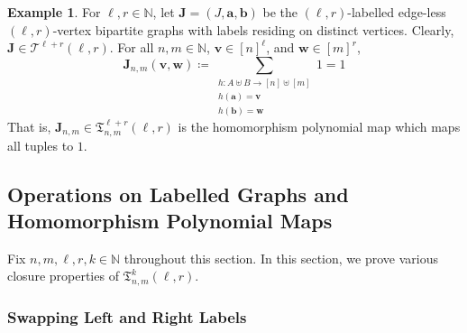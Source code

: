 \documentclass[10pt,a4paper]{article}
\theoremstyle{definition}
\newtheorem{example}[definition]{Example}
\theoremstyle{plain}
\theoremstyle{remark}
\begin{document}
	\begin{example}\label{ex:one}
		For $\ell, r \in \mathbb{N}$,
		let $\boldsymbol{J} = (J, \boldsymbol{a}, \boldsymbol{b})$ be the $(\ell, r)$-labelled edge-less $(\ell, r)$-vertex bipartite graphs with labels residing on distinct vertices. 
		Clearly, $\boldsymbol{J} \in \mathcal{T}^{\ell+r}(\ell, r)$.
		For all $n, m \in \mathbb{N}$, $\boldsymbol{v} \in [n]^\ell$, and $\boldsymbol{w} \in [m]^r$,
		\[
			\boldsymbol{J}_{n,m}(\boldsymbol{v}, \boldsymbol{w}) \coloneqq \sum_{\substack{h \colon A \uplus B \to [n] \uplus [m]\\ h(\boldsymbol{a}) = \boldsymbol{v} \\ h(\boldsymbol{b}) = \boldsymbol{w}}} 1 = 1
		\]
		That is, $\boldsymbol{J}_{n,m} \in \mathfrak{T}^{\ell+r}_{n,m}(\ell, r)$ is the homomorphism polynomial map which maps all tuples to $1$.
	\end{example}

	
	

	\subsection{Operations on Labelled Graphs and Homomorphism Polynomial Maps}
	\label{sec:ops}
	
	Fix  $n,m, \ell, r, k \in \mathbb{N}$ throughout this section.
	In this section, we prove various closure properties of $\mathfrak{T}_{n,m}^k(\ell, r)$.
	\subsubsection{Swapping Left and Right Labels}
	
\end{document}
